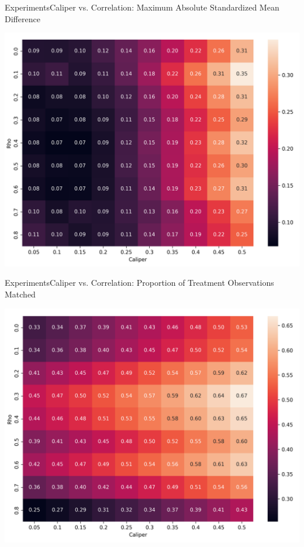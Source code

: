 \documentclass[11pt, compress]{beamer}
\begin{document}
\begin{frame}{Experiments}{Caliper vs. Correlation: Maximum Absolute Standardized Mean Difference}
	\begin{center}
		\includegraphics[width=\textwidth]{../paper/img/output30/caliper_vs_correlation_big/plots/rho_calipermax_abs_smd.png}
	\end{center}
\end{frame}
\begin{frame}{Experiments}{Caliper vs. Correlation: Proportion of Treatment Observations Matched}
	\begin{center}
		\includegraphics[width=\textwidth]{../paper/img/output30/caliper_vs_correlation_big/plots/rho_caliper_prop1_match.png}
	\end{center}
\end{frame}
\end{document}
